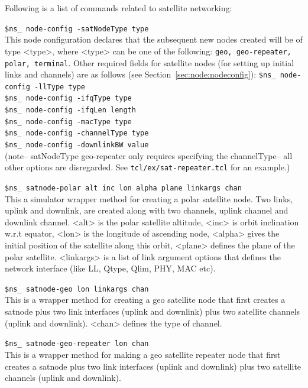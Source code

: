 Following is a list of commands related to satellite networking:
\begin{flushleft}
{\tt \$ns\_ node-config -satNodeType \<type\>}\\
This node configuration declares that the subsequent new nodes created
will be of type <type>, where <type> can be one of the following:
{\tt geo, geo-repeater, polar, terminal}.  Other required fields for
satellite nodes (for setting up initial links and channels) are as follows 
(see Section~\ref{sec:node:nodeconfig}):
{\tt \$ns\_ node-config -llType \<type\>}\\
{\tt \$ns\_ node-config -ifqType \<type\>}\\
{\tt \$ns\_ node-config -ifqLen \<length\>}\\
{\tt \$ns\_ node-config -macType \<type\>}\\
{\tt \$ns\_ node-config -channelType \<type\>}\\
{\tt \$ns\_ node-config -downlinkBW \<value\>}\\

(note-- satNodeType geo-repeater only requires specifying the channelType-- all other options are disregarded.  See {\tt tcl/ex/sat-repeater.tcl} for an example.)

{\tt \$ns\_ satnode-polar \<alt\> \<inc\> \<lon\> \<alpha\> \<plane\> \<linkargs\> \<chan\>}\\
This a simulator wrapper method for creating a polar satellite node. Two
links, uplink and downlink, are created along with two channels, uplink
channel and downlink channel. <alt> is the polar satellite altitude,
<inc> is orbit inclination w.r.t equator, <lon> is the longitude of 
ascending node, <alpha>
gives the initial position of the satellite along this orbit, <plane> 
defines the plane of
the polar satellite. <linkargs> is a list of link argument options that
defines the network interface (like LL, Qtype, Qlim, PHY, MAC etc).


{\tt \$ns\_ satnode-geo \<lon\> \<linkargs\> \<chan\>}\\
This is a wrapper method for creating a geo satellite node that first
creates a satnode plus two link interfaces (uplink and downlink) plus two 
satellite channels (uplink and downlink). <chan> defines the type of
channel.


{\tt \$ns\_ satnode-geo-repeater \<lon\> \<chan\>}\\
This is a wrapper method for making a geo satellite repeater node that 
first creates a satnode plus two link interfaces (uplink and downlink)
plus two satellite channels (uplink and downlink). 



\end{flushleft}
